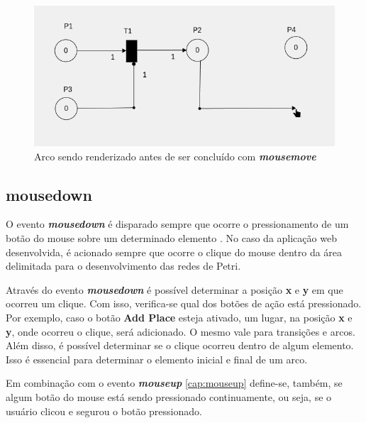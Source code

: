 \documentclass[
	12pt,				%
	openright,			%
	oneside,			%
	a4paper,			%
	english,			%
	brazil				%
	]{abntex2}
\begin{document}
\begin{figure}[ht] 
	\centering
	\includegraphics[scale=0.4]{figuras/mousemove_desenhando_arco.png}
	\caption[Mousemove desenhando arco]{Arco sendo renderizado antes de ser concluído com \textbf{\textit{mousemove}}}
	\label{fig:mousemove_desenhando_arco}
\end{figure}
\FloatBarrier

\subsection*{mousedown}\label{cap:mousedown}

O evento \textbf{\textit{mousedown}} é disparado sempre que ocorre o pressionamento de um botão do mouse sobre um determinado elemento \cite{mdn_mousedown_event}. No caso da aplicação web desenvolvida, é acionado sempre que ocorre o clique do mouse dentro da área delimitada para o desenvolvimento das redes de Petri. 



Através do evento \textbf{\textit{mousedown}} é possível determinar a posição \textbf{x} e \textbf{y} em que ocorreu um clique. Com isso, verifica-se qual dos botões de ação está pressionado. Por exemplo, caso o botão \textbf{Add Place} esteja ativado, um lugar, na posição \textbf{x} e \textbf{y}, onde ocorreu o clique, será adicionado. O mesmo vale para transições e arcos. Além disso, é possível determinar se o clique ocorreu dentro de algum elemento. Isso é essencial para determinar o elemento inicial e final de um arco. 

Em combinação com o evento \textbf{\textit{mouseup}} \ref{cap:mouseup} define-se, também, se algum botão do mouse está sendo pressionado continuamente, ou seja, se o usuário clicou e segurou o botão pressionado. 
\end{document}
